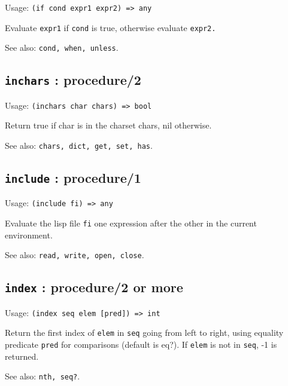 \documentclass[
]{article}
\newcommand{\passthrough}[1]{#1}
\begin{document}
Usage: \passthrough{\lstinline!(if cond expr1 expr2) => any!}

Evaluate \passthrough{\lstinline!expr1!} if
\passthrough{\lstinline!cond!} is true, otherwise evaluate
\passthrough{\lstinline!expr2.!}

See also: \passthrough{\lstinline!cond, when, unless!}.

\hypertarget{inchars-procedure2-1}{%
\subsection{\texorpdfstring{\texttt{inchars} :
procedure/2}{inchars : procedure/2}}\label{inchars-procedure2-1}}

Usage: \passthrough{\lstinline!(inchars char chars) => bool!}

Return true if char is in the charset chars, nil otherwise.

See also: \passthrough{\lstinline!chars, dict, get, set, has!}.

\hypertarget{include-procedure1-1}{%
\subsection{\texorpdfstring{\texttt{include} :
procedure/1}{include : procedure/1}}\label{include-procedure1-1}}

Usage: \passthrough{\lstinline!(include fi) => any!}

Evaluate the lisp file \passthrough{\lstinline!fi!} one expression after
the other in the current environment.

See also: \passthrough{\lstinline!read, write, open, close!}.

\hypertarget{index-procedure2-or-more-1}{%
\subsection{\texorpdfstring{\texttt{index} : procedure/2 or
more}{index : procedure/2 or more}}\label{index-procedure2-or-more-1}}

Usage: \passthrough{\lstinline!(index seq elem [pred]) => int!}

Return the first index of \passthrough{\lstinline!elem!} in
\passthrough{\lstinline!seq!} going from left to right, using equality
predicate \passthrough{\lstinline!pred!} for comparisons (default is
eq?). If \passthrough{\lstinline!elem!} is not in
\passthrough{\lstinline!seq!}, -1 is returned.

See also: \passthrough{\lstinline!nth, seq?!}.
\end{document}

